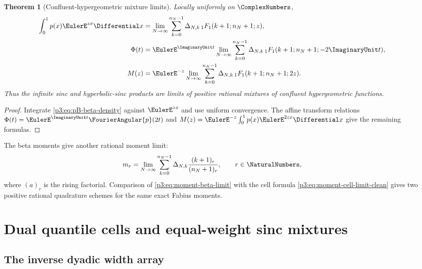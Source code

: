 \documentclass[11pt]{article}
\newtheorem{theorem}{Theorem}[section]
\theoremstyle{definition}
\theoremstyle{remark}
\begin{document}
\begin{theorem}[Confluent-hypergeometric mixture limits]
\label{p3:thm:hypergeometric-mixture}
Locally uniformly on $\ComplexNumbers$,
\begin{align}
 \int_0^1p(x)\EulerE^{zx}\Differential x
 &=\lim_{N\to\infty}\sum_{k=0}^{n_N-1}
 \Delta_{N,k}\,{}_1F_1(k+1;n_N+1;z),
 \label{p3:eq:p-MGF-beta}\\
 \Phi(t)
 &=\EulerE^{\ImaginaryUnit t}\lim_{N\to\infty}\sum_{k=0}^{n_N-1}
 \Delta_{N,k}\,{}_1F_1(k+1;n_N+1;-2\ImaginaryUnit t),
 \label{p3:eq:Phi-beta}\\
 M(z)
 &=\EulerE^{-z}\lim_{N\to\infty}\sum_{k=0}^{n_N-1}
 \Delta_{N,k}\,{}_1F_1(k+1;n_N+1;2z).
 \label{p3:eq:M-beta}
\end{align}
Thus the infinite sinc and hyperbolic-sinc products are limits of positive
rational mixtures of confluent hypergeometric functions.
\end{theorem}

\begin{proof}
Integrate \eqref{p3:eq:pB-beta-density} against $\EulerE^{zx}$ and use uniform
convergence.  The affine transform relations
$\Phi(t)=\EulerE^{\ImaginaryUnit t}\FourierAngular{p}(2t)$ and
$M(z)=\EulerE^{-z}\int_0^1p(x)\EulerE^{2zx}\Differential x$ give the remaining formulas.
\end{proof}

The beta moments give another rational moment limit:
\begin{equation}\label{p3:eq:moment-beta-limit}
 m_r=\lim_{N\to\infty}
 \sum_{k=0}^{n_N-1}\Delta_{N,k}
 \frac{(k+1)_r}{(n_N+1)_r},
 \qquad r\in\NaturalNumbers,
\end{equation}
where $(a)_r$ is the rising factorial.  Comparison of
\eqref{p3:eq:moment-beta-limit} with the cell formula
\eqref{p3:eq:moment-cell-limit-clean} gives two positive rational quadrature
schemes for the same exact Fabius moments.

\section{Dual quantile cells and equal-weight sinc mixtures}
\label{p3:sec:quantile-cells}

\subsection{The inverse dyadic width array}
\end{document}
